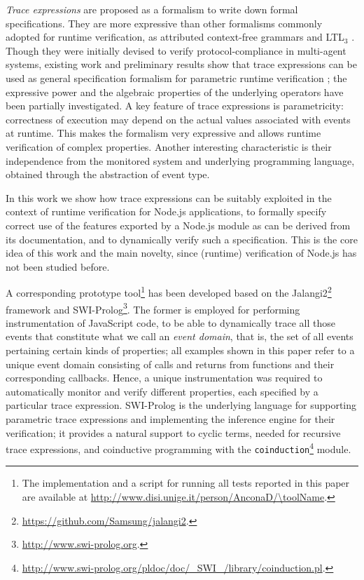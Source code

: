 \emph{Trace expressions} are proposed as a formalism to write down formal specifications.
They are more expressive than other formalisms commonly adopted for runtime verification, as
attributed context-free grammars \cite{de2014combining} and LTL$_3$ \cite{AnconaFM16}.
Though they were initially devised to verify protocol-compliance in multi-agent systems, existing work and preliminary results show that trace expressions can be used as general specification formalism for parametric runtime verification \cite{ParametricJava17, TowardsIoT17};
the expressive power and the algebraic properties of the underlying operators have been partially investigated.
A key feature of trace expressions is parametricity: correctness of execution may depend on the actual values associated with events at runtime.
This makes the formalism very expressive and allows runtime verification of complex properties.
Another interesting characteristic is their independence from the monitored system and underlying programming language,
obtained through the abstraction of event type.

In this work we show how trace expressions can be suitably exploited in the context of runtime verification for
Node.js applications, to formally specify correct use of the features exported by a Node.js module as
can be derived from its documentation, and to dynamically verify such a specification.
This is the core idea of this work and the main novelty, since (runtime) verification of Node.js has not been studied before.

A corresponding prototype tool\footnote{The implementation and a script for running all tests reported in this paper are available at \url{http://www.disi.unige.it/person/AnconaD/\toolName}.} has been developed based on the Jalangi2\footnote{\url{https://github.com/Samsung/jalangi2}.}
framework and SWI-Prolog\footnote{\url{http://www.swi-prolog.org}.}.
The former is employed for performing instrumentation of JavaScript code, to be able
to dynamically trace all those events that constitute what we call an \emph{event domain}, that is, the set
of all events pertaining certain kinds of properties;
all examples shown in this paper refer to a unique event domain consisting of calls and returns
from functions and their corresponding callbacks. Hence, a unique instrumentation
was required to automatically monitor and verify different properties, each specified by a particular trace expression.
SWI-Prolog is the underlying language for supporting parametric
trace expressions and implementing the inference engine for their verification; it provides
a natural support to cyclic terms, needed for recursive trace expressions, and coinductive
programming with the \lstinline{coinduction}\footnote{\url{http://www.swi-prolog.org/pldoc/doc/_SWI_/library/coinduction.pl}.}
module. 

